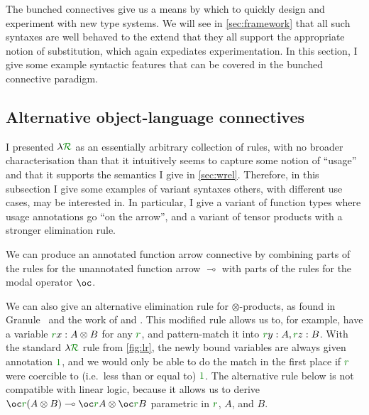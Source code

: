 The bunched connectives give us a means by which to quickly design and
experiment with new type systems.
We will see in \cref{sec:framework} that all such syntaxes are well behaved to
the extend that they all support the appropriate notion of substitution, which
again expediates experimentation.
In this section, I give some example syntactic features that can be covered in
the bunched connective paradigm.

\subsection{Alternative object-language connectives}\label{sec:alt}

I presented $\name$ as an essentially arbitrary collection of rules, with no
broader characterisation than that it intuitively seems to capture some notion
of ``usage'' and that it supports the semantics I give in \cref{sec:wrel}.
Therefore, in this subsection I give some examples of variant syntaxes others,
with different use cases, may be interested in.
In particular, I give a variant of function types where usage annotations go
``on the arrow'', and a variant of tensor products with a stronger elimination
rule.

We can produce an annotated function arrow connective by combining parts of the
rules for the unannotated function arrow $\multimap$ with parts of the rules for
the modal operator $\oc$.


We can also give an alternative elimination rule for $\otimes$-products, as
found in Granule~\citep{Granule18,HMWO21} and the work of
\citet{AbelBernardy2020} and \citet{reed10distance}.
This modified rule allows us to, for example, have a variable
$\gr rx : A \otimes B$ for any $\gr r$, and pattern-match it into
$\gr ry : A, \gr rz : B$.
With the standard $\name$ rule from \cref{fig:lr}, the newly bound variables are
always given annotation $\gr 1$, and we would only be able to do the match in
the first place if $\gr r$ were coercible to (i.e.\ less than or equal to)
$\gr1$.
The alternative rule below is not compatible with linear logic, because it
allows us to derive
$\oc\gr r\plr{A \otimes B} \multimap \oc\gr rA \otimes \oc\gr r B$
parametric in $\gr r$, $A$, and $B$.

